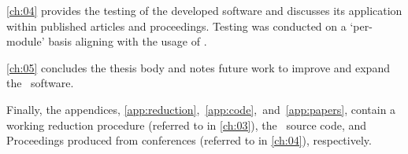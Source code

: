 \autoref{ch:04} provides the testing of the developed software and discusses its application within published articles and proceedings.
Testing was conducted on a `per-module' basis aligning with the usage of \stops.

\autoref{ch:05} concludes the thesis body and notes future work to improve and expand the \stops\ software.  %

Finally, the appendices, \autoref{app:reduction},~\ref{app:code},~and~\ref{app:papers}, contain a working reduction procedure (referred to in \autoref{ch:03}), the \stops\ source code, and Proceedings produced from conferences (referred to in \autoref{ch:04}), respectively.





